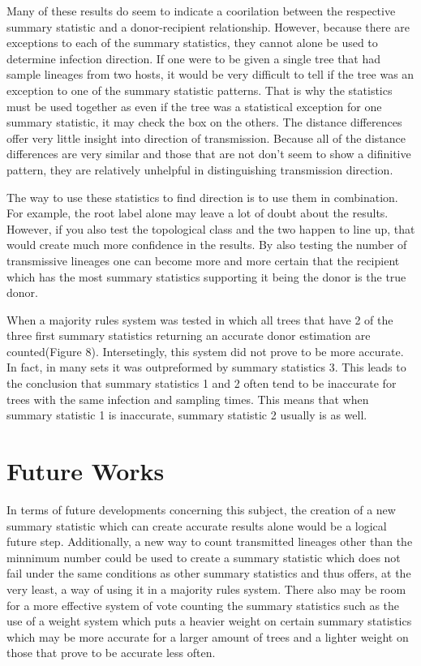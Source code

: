\documentclass[final,5p,times,twocolumn,authoryear]{elsarticle}
\begin{document}
Many of these results do seem to indicate a coorilation between the respective summary statistic and a donor-recipient relationship. However, because there are exceptions to each of the summary statistics, they cannot alone be used to determine infection direction. If one were to be given a single tree that had sample lineages from two hosts, it would be very difficult to tell if the tree was an exception to one of the summary statistic patterns. That is why the statistics must be used together as even if the tree was a statistical exception for one summary statistic, it may check the box on the others. The distance differences offer very little insight into direction of transmission. Because all of the distance differences are very similar and those that are not don't seem to show a difinitive pattern, they are relatively unhelpful in distinguishing transmission direction.

The way to use these statistics to find direction is to use them in combination. For example, the root label alone may leave a lot of doubt about the results. However, if you also test the topological class and the two happen to line up, that would create much more confidence in the results. By also testing the number of transmissive lineages one can become more and more certain that the recipient which has the most summary statistics supporting it being the donor is the true donor.

When a majority rules system was tested in which all trees that have 2 of the three first summary statistics returning an accurate donor estimation are counted(Figure 8). Intersetingly, this system did not prove to be more accurate. In fact, in many sets it was outpreformed by summary statistics 3. This leads to the conclusion that summary statistics 1 and 2 often tend to be inaccurate for trees with the same infection and sampling times. This means that when summary statistic 1 is inaccurate, summary statistic 2 usually is as well.

\section{Future Works}
\label{Future Works}
In terms of future developments concerning this subject, the creation of a new summary statistic which can create accurate results alone would be a logical future step. Additionally, a new way to count transmitted lineages other than the minnimum number could be used to create a summary statistic which does not fail under the same conditions as other summary statistics and thus offers, at the very least, a way of using it in a majority rules system. There also may be room for a more effective system of vote counting the summary statistics such as the use of a weight system which puts a heavier weight on certain summary statistics which may be more accurate for a larger amount of trees and a lighter weight on those that prove to be accurate less often.
\end{document}
